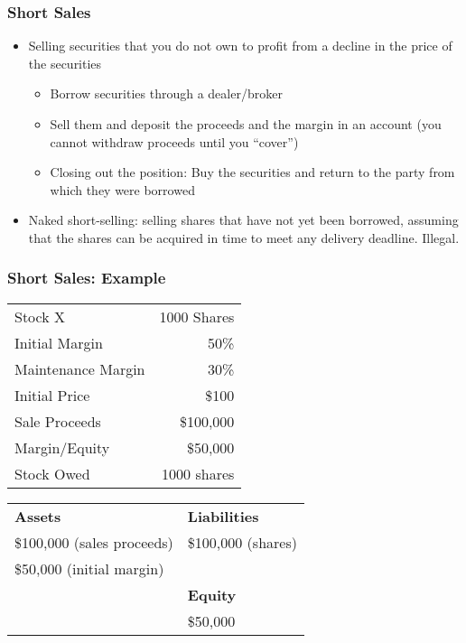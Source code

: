 \documentclass[10pt]{beamer}
\begin{document}
	\begin{frame}
		\frametitle{Short Sales}
		
		\begin{itemize} \vspace{5pt} \itemsep10pt
			\item Selling securities that you do not own to profit from a decline in the price of the securities
			\smallskip
			\begin{itemize}
				\item Borrow securities through a dealer/broker
				\item Sell them and deposit the proceeds and the margin in an account (you cannot withdraw proceeds until you ``cover'')
				\item Closing out the position: Buy the securities and return to the party from which they were borrowed
			\end{itemize}
			
			\item Naked short-selling: selling shares that have not yet been borrowed, assuming that the shares can be acquired in time to meet any delivery deadline. Illegal.
			
			
		\end{itemize}
	\end{frame}
	\begin{frame}
		\frametitle{Short Sales: Example}
		
		\begin{table}
			\begin{tabular}{lr} 
				\toprule
				Stock X				&1000 Shares	\\
				Initial Margin		&50\%			\\
				Maintenance Margin	&30\%			\\
				Initial Price		&\$100			\\
				Sale Proceeds	   	&\$100,000		\\
				Margin/Equity		&\$50,000		\\
				Stock Owed 	   		&1000 shares	\\
				\bottomrule
			\end{tabular}
		\end{table}
		
		\begin{table}
			\begin{tabular}{ll} 
				\toprule
				\textbf{Assets}				&\textbf{Liabilities}	\\
				\$100,000 (sales proceeds)	&\$100,000 (shares)		\\
				\$50,000 (initial margin)	&						\\
				&\textbf{Equity}		\\
				&\$50,000 				\\
				\bottomrule
			\end{tabular}
		\end{table}
		
	\end{frame}
\end{document}
